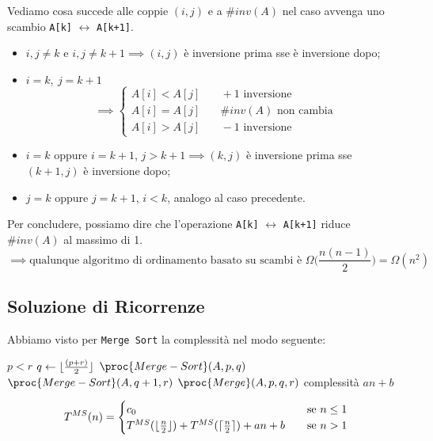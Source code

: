 Vediamo cosa succede alle coppie $(i,j)$ e a $\# inv(A)$ nel caso avvenga uno scambio \texttt{A[k]}
$\leftrightarrow$ \texttt{A[k+1]}.

\begin{itemize}
	\item $i,j \neq k$ e $i,j \neq k+1 \implies (i,j)$ è inversione prima sse è inversione dopo;
	\item $i = k, \ j = k+1$
	\[ \implies
	\begin{cases}
		A[i] < A[j] & \quad +1 \text{ inversione} \\
		A[i] = A[j] & \quad \# inv(A) \text{ non cambia} \\
		A[i] > A[j] & \quad -1 \text{ inversione}
	\end{cases}
	\]
	\item $i = k$ oppure $i = k+1$, $j > k+1 \implies (k,j)$ è inversione prima sse $(k+1,j)$ è
	inversione dopo;
	\item $j = k$ oppure $j = k+1$, $i < k$, analogo al caso precedente.
\end{itemize}

Per concludere, possiamo dire che l'operazione \texttt{A[k]} $\leftrightarrow$ \texttt{A[k+1]}
riduce $\# inv(A)$ al massimo di 1.
\begin{displaymath}
	\implies \text{qualunque algoritmo di ordinamento basato su scambi è } \Omega \Big(\frac{n(n-1)}{2} \Big) = \Omega (n^2)
\end{displaymath}

\subsection{Soluzione di Ricorrenze}
Abbiamo visto per \texttt{Merge Sort} la complessità nel modo seguente:

\begin{codebox}
	\li \If $p < r$
	\li     \Then
	$q \gets \lfloor\frac{(p + r)}{2}\rfloor$ 
	\li         $\proc{Merge-Sort}(A,p,q)$
	\li         $\proc{Merge-Sort}(A,q+1,r)$
	\li         $\proc{Merge}(A,p,q,r)$
	\Comment complessità $an + b$
	\End
\end{codebox}

\[ T^{MS}(n) =
\begin{cases}
c_0       & \quad \text{se } n \leq 1 \\
T^{MS}(\lfloor\frac{n}{2}\rfloor)+T^{MS}(\lceil\frac{n}{2}\rceil) + an + b  & \quad \text{se } n>1
\end{cases}
\]

